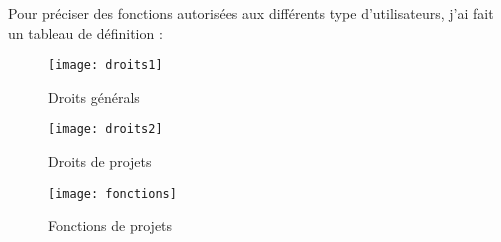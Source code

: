 Pour préciser des fonctions autorisées aux différents type d’utilisateurs, j’ai fait un tableau de définition :
\begin{figure}[ht]
\centering
\texttt{[image: droits1]}
\caption{Droits générals}
\texttt{[image: droits2]}
\caption{Droits de projets}
\end{figure}
\begin{figure}[ht]
\centering
\texttt{[image: fonctions]}
\caption{Fonctions de projets}
\end{figure}